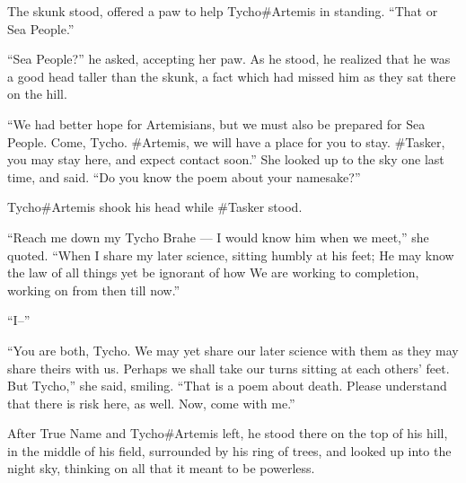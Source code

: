 The skunk stood, offered a paw to help Tycho\#Artemis in standing. ``That or Sea People.''

``Sea People?'' he asked, accepting her paw. As he stood, he realized that he was a good head taller than the skunk, a fact which had missed him as they sat there on the hill.

``We had better hope for Artemisians, but we must also be prepared for Sea People. Come, Tycho. \#Artemis, we will have a place for you to stay. \#Tasker, you may stay here, and expect contact soon.'' She looked up to the sky one last time, and said. ``Do you know the poem about your namesake?''

Tycho\#Artemis shook his head while \#Tasker stood.

``Reach me down my Tycho Brahe — I would know him when we meet,'' she quoted. ``When I share my later science, sitting humbly at his feet; He may know the law of all things yet be ignorant of how We are working to completion, working on from then till now.''

``I--''

``You are both, Tycho. We may yet share our later science with them as they may share theirs with us. Perhaps we shall take our turns sitting at each others' feet. But Tycho,'' she said, smiling. ``That is a poem about death. Please understand that there is risk here, as well. Now, come with me.''

After True Name and Tycho\#Artemis left, he stood there on the top of his hill, in the middle of his field, surrounded by his ring of trees, and looked up into the night sky, thinking on all that it meant to be powerless.
